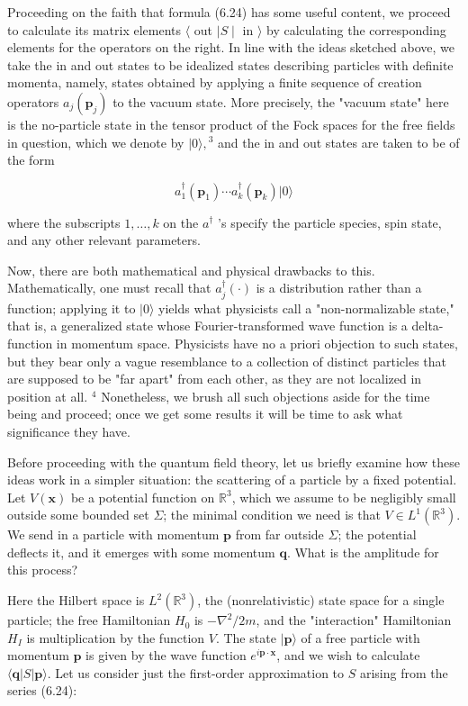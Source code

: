 \documentclass[10pt, letterpaper]{article}
\begin{document}
Proceeding on the faith that formula (6.24) has some useful content, we proceed to calculate its matrix elements $\langle$ out $| S \mid$ in $\rangle$ by calculating the corresponding elements for the operators on the right. In line with the ideas sketched above, we take the in and out states to be idealized states describing particles with definite momenta, namely, states obtained by applying a finite sequence of creation operators $a_{j}\left(\mathbf{p}_{j}\right)$ to the vacuum state. More precisely, the "vacuum state" here is the no-particle state in the tensor product of the Fock spaces for the free fields in question, which we denote by $|0\rangle,{ }^{3}$ and the in and out states are taken to be of the form

$$
a_{1}^{\dagger}\left(\mathbf{p}_{1}\right) \cdots a_{k}^{\dagger}\left(\mathbf{p}_{k}\right)|0\rangle
$$

where the subscripts $1, \ldots, k$ on the $a^{\dagger}$ 's specify the particle species, spin state, and any other relevant parameters.

Now, there are both mathematical and physical drawbacks to this. Mathematically, one must recall that $a_{j}^{\dagger}(\cdot)$ is a distribution rather than a function; applying it to $|0\rangle$ yields what physicists call a "non-normalizable state," that is, a generalized state whose Fourier-transformed wave function is a delta-function in momentum space. Physicists have no a priori objection to such states, but they bear only a vague resemblance to a collection of distinct particles that are supposed to be "far apart" from each other, as they are not localized in position at all. ${ }^{4}$ Nonetheless, we brush all such objections aside for the time being and proceed; once we get some results it will be time to ask what significance they have.

Before proceeding with the quantum field theory, let us briefly examine how these ideas work in a simpler situation: the scattering of a particle by a fixed potential. Let $V(\mathbf{x})$ be a potential function on $\mathbb{R}^{3}$, which we assume to be negligibly small outside some bounded set $\Sigma$; the minimal condition we need is that $V \in L^{1}\left(\mathbb{R}^{3}\right)$. We send in a particle with momentum $\mathbf{p}$ from far outside $\Sigma$; the potential deflects it, and it emerges with some momentum $\mathbf{q}$. What is the amplitude for this process?

Here the Hilbert space is $L^{2}\left(\mathbb{R}^{3}\right)$, the (nonrelativistic) state space for a single particle; the free Hamiltonian $H_{0}$ is $-\nabla^{2} / 2 m$, and the "interaction" Hamiltonian $H_{I}$ is multiplication by the function $V$. The state $|\mathbf{p}\rangle$ of a free particle with momentum $\mathbf{p}$ is given by the wave function $e^{i \mathbf{p} \cdot \mathbf{x}}$, and we wish to calculate $\langle\mathbf{q}| S|\mathbf{p}\rangle$. Let us consider just the first-order approximation to $S$ arising from the series (6.24):
\end{document}
